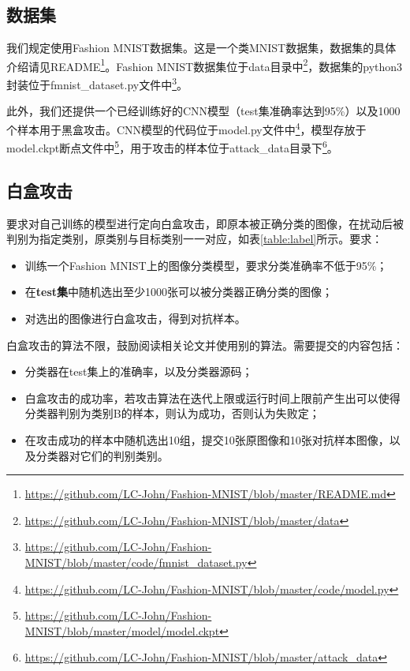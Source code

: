 \documentclass[journal, a4paper]{IEEEtran}
\begin{document}
\subsection{数据集}
\label{section:requirement;subsection:dataset}

我们规定使用Fashion MNIST数据集。这是一个类MNIST数据集，数据集的具体介绍请见README\footnote{\url{https://github.com/LC-John/Fashion-MNIST/blob/master/README.md}}。Fashion MNIST数据集位于data目录中\footnote{\url{https://github.com/LC-John/Fashion-MNIST/blob/master/data}}，数据集的python3封装位于fmnist\_dataset.py文件中\footnote{\url{https://github.com/LC-John/Fashion-MNIST/blob/master/code/fmnist_dataset.py}}。

此外，我们还提供一个已经训练好的CNN模型（test集准确率达到95\%）以及1000个样本用于黑盒攻击。CNN模型的代码位于model.py文件中\footnote{\url{https://github.com/LC-John/Fashion-MNIST/blob/master/code/model.py}}，模型存放于model.ckpt断点文件中\footnote{\url{https://github.com/LC-John/Fashion-MNIST/blob/master/model/model.ckpt}}，用于攻击的样本位于attack\_data目录下\footnote{\url{https://github.com/LC-John/Fashion-MNIST/blob/master/attack\_data}}。

\subsection{白盒攻击}
\label{section:requirement;subsection:white-box attack}

要求对自己训练的模型进行定向白盒攻击，即原本被正确分类的图像，在扰动后被判别为指定类别，原类别与目标类别一一对应，如表\ref{table:label}所示。要求：

\begin{itemize}
    \item 训练一个Fashion MNIST上的图像分类模型，要求分类准确率不低于95\%；
    \item 在\textbf{test集}中随机选出至少1000张可以被分类器正确分类的图像；
    \item 对选出的图像进行白盒攻击，得到对抗样本。
\end{itemize}

白盒攻击的算法不限，鼓励阅读相关论文并使用别的算法。需要提交的内容包括：

\begin{itemize}
    \item 分类器在test集上的准确率，以及分类器源码；
    \item 白盒攻击的成功率，若攻击算法在迭代上限或运行时间上限前产生出可以使得分类器判别为类别B的样本，则认为成功，否则认为失败定；
    \item 在攻击成功的样本中随机选出10组，提交10张原图像和10张对抗样本图像，以及分类器对它们的判别类别。
\end{itemize}
\end{document}
